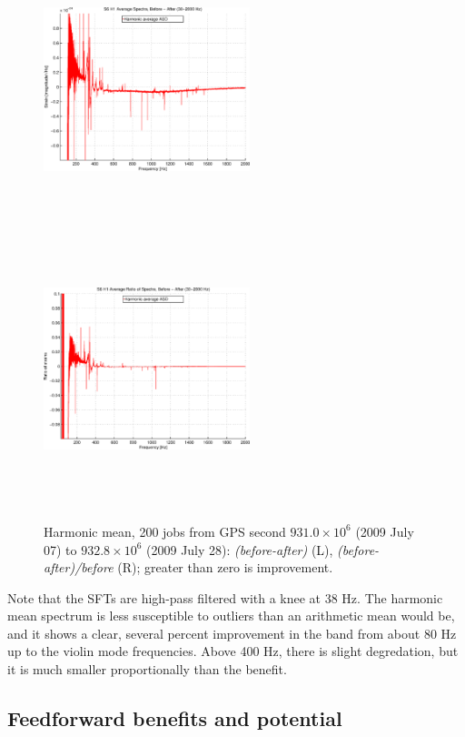 \begin{figure}
\begin{center}
\includegraphics[height=80mm, width=60mm]{figure13a.eps}
\includegraphics[height=80mm, width=60mm]{figure13b.eps}
\caption{Harmonic mean,
200 jobs from GPS second $931.0 \times 10^6$ (2009 July 07) to $932.8\times 10^6$ (2009 July 28): \textit{(before-after)} (L), \textit{(before-after)/before} (R); greater than zero is improvement.}
\label{SFTgraph}
\end{center}
\end{figure}

Note that the SFTs are high-pass filtered with a knee at 38 Hz. The harmonic mean spectrum is less susceptible to outliers than an arithmetic mean would be, and it shows a clear, several percent improvement in the band from about 80 Hz up to the violin mode frequencies. Above 400 Hz, there is slight degredation, but it is much smaller proportionally than the benefit. 

        \subsection{Feedforward benefits and potential}
        \label{benefits}

